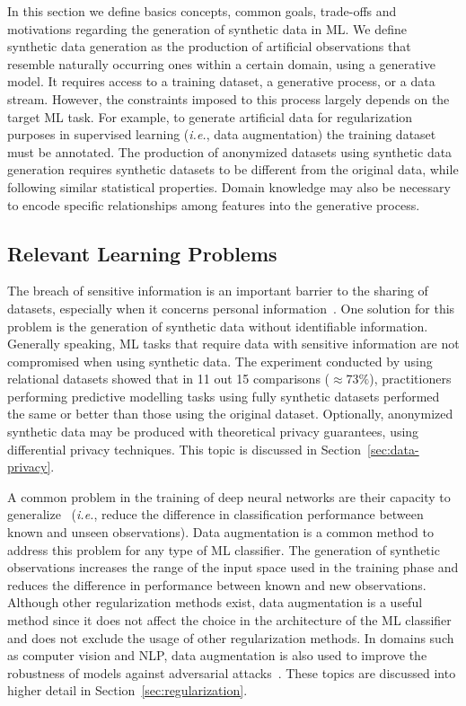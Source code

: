\documentclass[parskip=full]{scrartcl}
\begin{document}
In this section we define basics concepts, common goals, trade-offs and
motivations regarding the generation of synthetic data in ML\@. We define
synthetic data generation as the production of artificial observations that
resemble naturally occurring ones within a certain domain, using a generative
model. It requires access to a training dataset, a generative process, or a
data stream. However, the constraints imposed to this process largely depends
on the target ML task. For example, to generate artificial data for
regularization purposes in supervised learning (\textit{i.e.}, data
augmentation) the training dataset must be annotated. The production of
anonymized datasets using synthetic data generation requires synthetic
datasets to be different from the original data, while following similar
statistical properties. Domain knowledge may also be necessary to encode
specific relationships among features into the generative process.


\subsection{Relevant Learning Problems}

The breach of sensitive information is an important barrier to the sharing of
datasets, especially when it concerns personal
information~\cite{dankar2021fake}. One solution for this problem is the
generation of synthetic data without identifiable information. Generally
speaking, ML tasks that require data with sensitive information are not
compromised when using synthetic data. The experiment conducted by
\citet{patki2016synthetic} using relational datasets showed that in 11 out 15
comparisons ($\approx 73\%$), practitioners performing predictive modelling
tasks using fully synthetic datasets performed the same or better than those
using the original dataset. Optionally, anonymized synthetic data may be
produced with theoretical privacy guarantees, using differential privacy
techniques. This topic is discussed in Section~\ref{sec:data-privacy}.

A common problem in the training of deep neural networks are their capacity to
generalize~\cite{Zhang2021} (\textit{i.e.}, reduce the difference in
classification performance between known and unseen observations). Data
augmentation is a common method to address this problem for any type of ML
classifier. The generation of synthetic observations increases the range of
the input space used in the training phase and reduces the difference in
performance between known and new observations. Although other regularization
methods exist, data augmentation is a useful method since it does not affect
the choice in the architecture of the ML classifier and does not exclude the
usage of other regularization methods. In domains such as computer vision and
NLP, data augmentation is also used to improve the robustness of models
against adversarial attacks~\cite{zeng2020data, morris2020textattack}. These
topics are discussed into higher detail in Section~\ref{sec:regularization}.
\end{document}
